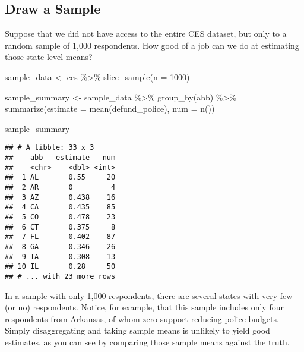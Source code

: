 \documentclass[
]{article}
\newenvironment{Shaded}{\begin{snugshade}}{\end{snugshade}}
\newcommand{\AttributeTok}[1]{\textcolor[rgb]{0.77,0.63,0.00}{#1}}
\newcommand{\DecValTok}[1]{\textcolor[rgb]{0.00,0.00,0.81}{#1}}
\newcommand{\FunctionTok}[1]{\textcolor[rgb]{0.00,0.00,0.00}{#1}}
\newcommand{\NormalTok}[1]{#1}
\newcommand{\OtherTok}[1]{\textcolor[rgb]{0.56,0.35,0.01}{#1}}
\newcommand{\SpecialCharTok}[1]{\textcolor[rgb]{0.00,0.00,0.00}{#1}}
\begin{document}
\hypertarget{draw-a-sample}{%
\subsection{Draw a Sample}\label{draw-a-sample}}

Suppose that we did not have access to the entire CES dataset, but only
to a random sample of 1,000 respondents. How good of a job can we do at
estimating those state-level means?

\begin{Shaded}
\begin{Highlighting}[]
\NormalTok{sample\_data }\OtherTok{\textless{}{-}}\NormalTok{ ces }\SpecialCharTok{\%\textgreater{}\%} 
  \FunctionTok{slice\_sample}\NormalTok{(}\AttributeTok{n =} \DecValTok{1000}\NormalTok{)}
\end{Highlighting}
\end{Shaded}

\begin{Shaded}
\begin{Highlighting}[]
\NormalTok{sample\_summary }\OtherTok{\textless{}{-}}\NormalTok{ sample\_data }\SpecialCharTok{\%\textgreater{}\%} 
  \FunctionTok{group\_by}\NormalTok{(abb) }\SpecialCharTok{\%\textgreater{}\%} 
  \FunctionTok{summarize}\NormalTok{(}\AttributeTok{estimate =} \FunctionTok{mean}\NormalTok{(defund\_police),}
            \AttributeTok{num =} \FunctionTok{n}\NormalTok{())}

\NormalTok{sample\_summary}
\end{Highlighting}
\end{Shaded}

\begin{verbatim}
## # A tibble: 33 x 3
##    abb   estimate   num
##    <chr>    <dbl> <int>
##  1 AL       0.55     20
##  2 AR       0         4
##  3 AZ       0.438    16
##  4 CA       0.435    85
##  5 CO       0.478    23
##  6 CT       0.375     8
##  7 FL       0.402    87
##  8 GA       0.346    26
##  9 IA       0.308    13
## 10 IL       0.28     50
## # ... with 23 more rows
\end{verbatim}

In a sample with only 1,000 respondents, there are several states with
very few (or no) respondents. Notice, for example, that this sample
includes only four respondents from Arkansas, of whom zero support
reducing police budgets. Simply disaggregating and taking sample means
is unlikely to yield good estimates, as you can see by comparing those
sample means against the truth.
\end{document}
